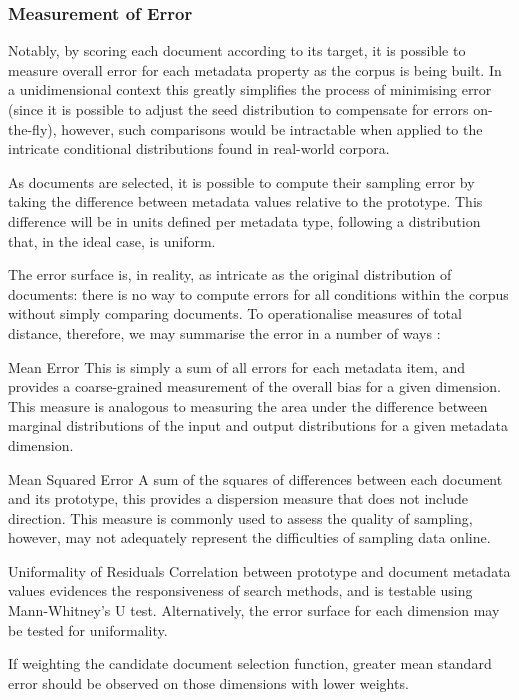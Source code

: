\subsubsection{Measurement of Error}
\label{sec:rebuilding:method:errormeasure}
Notably, by scoring each document according to its target, it is possible to measure overall error for each metadata property as the corpus is being built.  In a unidimensional context this greatly simplifies the process of minimising error (since it is possible to adjust the seed distribution to compensate for errors on-the-fly), however, such comparisons would be intractable when applied to the intricate conditional distributions found in real-world corpora.



As documents are selected, it is possible to compute their sampling error by taking the difference between metadata values relative to the prototype.  This difference will be in units defined per metadata type, following a distribution that, in the ideal case, is uniform.

The error surface is, in reality, as intricate as the original distribution of documents: there is no way to compute errors for all conditions within the corpus without simply comparing documents.  To operationalise measures of total distance, therefore, we may summarise the error in a number of ways :

\begin{itemizeTitle}

    \item[Mean Error] This is simply a sum of all errors for each metadata item, and provides a coarse-grained measurement of the overall bias for a given dimension.  This measure is analogous to measuring the area under the difference between marginal distributions of the input and output distributions for a given metadata dimension.

    \item[Mean Squared Error] A sum of the squares of differences between each document and its prototype, this provides a dispersion measure that does not include direction.  This measure is commonly used to assess the quality of sampling, however, may not adequately represent the difficulties of sampling data online.

    \item[Uniformality of Residuals] Correlation between prototype and document metadata values evidences the responsiveness of search methods, and is testable using Mann-Whitney's U test.  Alternatively, the error surface for each dimension may be tested for uniformality.

\end{itemizeTitle}



If weighting the candidate document selection function, greater mean standard error should be observed on those dimensions with lower weights.








